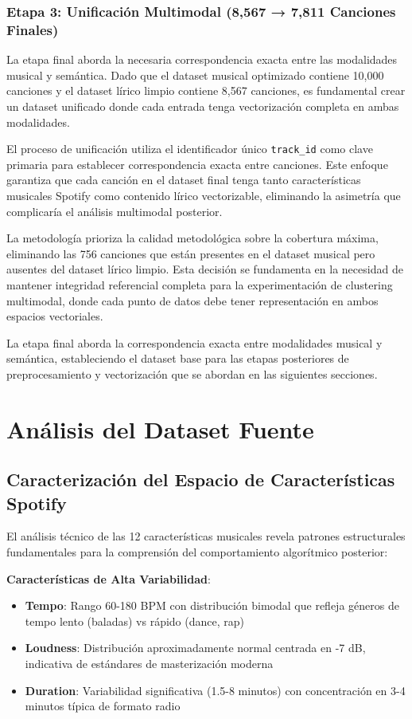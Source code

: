 \documentclass[12pt,a4paper]{report}
\begin{document}
\subsubsection{Etapa 3: Unificación Multimodal (8,567 → 7,811 Canciones Finales)}

La etapa final aborda la necesaria correspondencia exacta entre las modalidades musical y semántica. Dado que el dataset musical optimizado contiene 10,000 canciones y el dataset lírico limpio contiene 8,567 canciones, es fundamental crear un dataset unificado donde cada entrada tenga vectorización completa en ambas modalidades.

El proceso de unificación utiliza el identificador único \texttt{track\_id} como clave primaria para establecer correspondencia exacta entre canciones. Este enfoque garantiza que cada canción en el dataset final tenga tanto características musicales Spotify como contenido lírico vectorizable, eliminando la asimetría que complicaría el análisis multimodal posterior.

La metodología prioriza la calidad metodológica sobre la cobertura máxima, eliminando las 756 canciones que están presentes en el dataset musical pero ausentes del dataset lírico limpio. Esta decisión se fundamenta en la necesidad de mantener integridad referencial completa para la experimentación de clustering multimodal, donde cada punto de datos debe tener representación en ambos espacios vectoriales.

La etapa final aborda la correspondencia exacta entre modalidades musical y semántica, estableciendo el dataset base para las etapas posteriores de preprocesamiento y vectorización que se abordan en las siguientes secciones.

\section{Análisis del Dataset Fuente}

\subsection{Caracterización del Espacio de Características Spotify}

El análisis técnico de las 12 características musicales revela patrones estructurales fundamentales para la comprensión del comportamiento algorítmico posterior:

\textbf{Características de Alta Variabilidad}:
\begin{itemize}
\item \textbf{Tempo}: Rango 60-180 BPM con distribución bimodal que refleja géneros de tempo lento (baladas) vs rápido (dance, rap)
\item \textbf{Loudness}: Distribución aproximadamente normal centrada en -7 dB, indicativa de estándares de masterización moderna
\item \textbf{Duration}: Variabilidad significativa (1.5-8 minutos) con concentración en 3-4 minutos típica de formato radio
\end{itemize}
\end{document}

